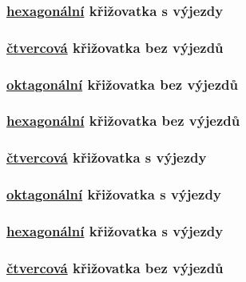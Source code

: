 \subsubsection{ \hyperref[subsec:hexagonalni_typ]{hexagonální} křižovatka s výjezdy}
\label{subsubsec:exp_ars_stredni_hexagoalni_krizovatka_ex}


\subsubsection{ \hyperref[subsec:ctvercovy_typ]{čtvercová} křižovatka bez výjezdů}
\label{subsubsec:exp_ars_stredni_ctvercova_krizovatka_noex}

\subsubsection{ \hyperref[subsec:oktagonalni_typ]{oktagonální} křižovatka bez výjezdů}
\label{subsubsec:exp_ars_stredni_oktagonalni_krizovatka_noex}

\subsubsection{ \hyperref[subsec:hexagonalni_typ]{hexagonální} křižovatka bez výjezdů}
\label{subsubsec:exp_ars_stredni_hexagoalni_krizovatka_noex}


\subsubsection{ \hyperref[subsec:ctvercovy_typ]{čtvercová} křižovatka s výjezdy}
\label{subsubsec:exp_ars_velka_ctvercova_krizovatka_ex}

\subsubsection{ \hyperref[subsec:oktagonalni_typ]{oktagonální} křižovatka s výjezdy}
\label{subsubsec:exp_ars_velka_oktagonalni_krizovatka_ex}

\subsubsection{ \hyperref[subsec:hexagonalni_typ]{hexagonální} křižovatka s výjezdy}
\label{subsubsec:exp_ars_velka_hexagoalni_krizovatka_ex}


\subsubsection{ \hyperref[subsec:ctvercovy_typ]{čtvercová} křižovatka bez výjezdů}
\label{subsubsec:exp_ars_velka_ctvercova_krizovatka_noex}

